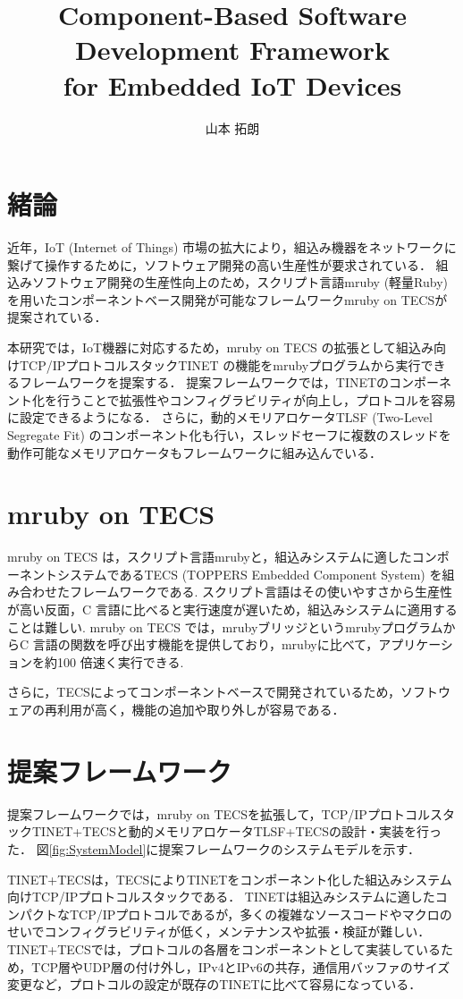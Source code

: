 \documentclass[a4j,10pt,twocolumn]{../styles/utf8/abstract}
\title{Component-Based Software Development Framework\\for Embedded IoT Devices}	%
\author{山本 拓朗} 		%
\begin{document}
\absttitle 		%

\section{緒論}

近年，IoT (Internet of Things) 市場の拡大により，組込み機器をネットワークに繋げて操作するために，ソフトウェア開発の高い生産性が要求されている．
組込みソフトウェア開発の生産性向上のため，スクリプト言語mruby (軽量Ruby) を用いたコンポーネントベース開発が可能なフレームワークmruby on TECS\cite{par:mrubyonTECS}が提案されている．

本研究では，IoT機器に対応するため，mruby on TECS の拡張として組込み向けTCP/IPプロトコルスタックTINET の機能をmrubyプログラムから実行できるフレームワークを提案する．
提案フレームワークでは，TINETのコンポーネント化を行うことで拡張性やコンフィグラビリティが向上し，プロトコルを容易に設定できるようになる．
さらに，動的メモリアロケータTLSF (Two-Level Segregate Fit) のコンポーネント化も行い，スレッドセーフに複数のスレッドを動作可能なメモリアロケータもフレームワークに組み込んでいる．

\section{mruby on TECS}

mruby on TECS は，スクリプト言語mrubyと，組込みシステムに適したコンポーネントシステムであるTECS (TOPPERS Embedded Component System) を組み合わせたフレームワークである.
スクリプト言語はその使いやすさから生産性が高い反面，C 言語に比べると実行速度が遅いため，組込みシステムに適用することは難しい.
mruby on TECS では，mrubyブリッジというmrubyプログラムからC 言語の関数を呼び出す機能を提供しており，mrubyに比べて，アプリケーションを約100 倍速く実行できる.

さらに，TECSによってコンポーネントベースで開発されているため，ソフトウェアの再利用が高く，機能の追加や取り外しが容易である．

\section{提案フレームワーク}

提案フレームワークでは，mruby on TECSを拡張して，TCP/IPプロトコルスタックTINET+TECSと動的メモリアロケータTLSF+TECSの設計・実装を行った．
図\ref{fig:SystemModel}に提案フレームワークのシステムモデルを示す．

TINET+TECSは，TECSによりTINETをコンポーネント化した組込みシステム向けTCP/IPプロトコルスタックである．
TINETは組込みシステムに適したコンパクトなTCP/IPプロトコルであるが，多くの複雑なソースコードやマクロのせいでコンフィグラビリティが低く，メンテナンスや拡張・検証が難しい．
TINET+TECSでは，プロトコルの各層をコンポーネントとして実装しているため，TCP層やUDP層の付け外し，IPv4とIPv6の共存，通信用バッファのサイズ変更など，プロトコルの設定が既存のTINETに比べて容易になっている．
\end{document}
